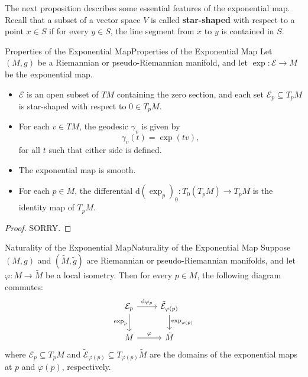 \documentclass[../main.tex]{subfiles}
\begin{document}
The next proposition describes some essential features of the exponential map. Recall that a subset of a vector space $V$ is called \textbf{star-shaped} with respect to a point $x \in S$ if for every $y \in S$, the line segment from $x$ to $y$ is contained in $S$.

\begin{proposition}{Properties of the Exponential Map}{Properties of the Exponential Map}
	Let $(M, g)$ be a Riemannian or pseudo-Riemannian manifold, and let $\exp: \mathcal{E} \to M$ be the exponential map.
	\begin{itemize}
		\item $\mathcal{E}$ is an open subset of $TM$ containing the zero section, and each set $\mathcal{E}_p \subseteq T_p M$ is star-shaped with respect to $0 \in T_p M$.
		\item For each $v \in TM$, the geodesic $\gamma_v$ is given by
		      \begin{equation}
			      \gamma_v(t) = \exp(tv),
		      \end{equation}
		      for all $t$ such that either side is defined.
		\item The exponential map is smooth.
		\item For each $p \in M$, the differential $\mathrm{d} (\exp_p)_0: T_0(T_p M) \to T_p M$ is the identity map of $T_p M$.
	\end{itemize}
\end{proposition}
\begin{proof}
	SORRY.
\end{proof}

\begin{proposition}{Naturality of the Exponential Map}{Naturality of the Exponential Map}
	Suppose $(M, g)$ and $(\tilde{M}, \tilde{g})$ are Riemannian or pseudo-Riemannian manifolds, and let $\varphi: M \to \tilde{M}$ be a local isometry. Then for every $p \in M$, the following diagram commutes:
	\begin{equation}
		\begin{tikzcd}
			\mathcal{E}_p \arrow[r, "\mathrm{d} \varphi_p"] \arrow[d, "\exp_p"'] & \tilde{\mathcal{E}}_{\varphi(p)} \arrow[d, "\exp_{\varphi(p)}"] \\
			M \arrow[r, "\varphi"] & \tilde{M}
		\end{tikzcd}
	\end{equation}
	where $\mathcal{E}_p \subseteq T_p M$ and $\tilde{\mathcal{E}}_{\varphi(p)} \subseteq T_{\varphi(p)} \tilde{M}$ are the domains of the exponential maps at $p$ and $\varphi(p)$, respectively.
\end{proposition}
\end{document}
